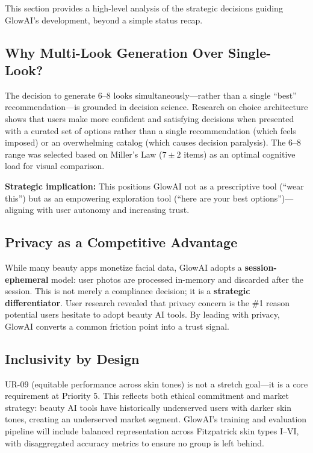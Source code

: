\documentclass[11pt, letterpaper]{article}
\begin{document}
This section provides a high-level analysis of the strategic decisions guiding GlowAI's development, beyond a simple status recap.

\subsection{Why Multi-Look Generation Over Single-Look?}

The decision to generate 6--8 looks simultaneously---rather than a single ``best'' recommendation---is grounded in decision science. Research on choice architecture shows that users make more confident and satisfying decisions when presented with a curated set of options rather than a single recommendation (which feels imposed) or an overwhelming catalog (which causes decision paralysis). The 6--8 range was selected based on Miller's Law ($7 \pm 2$ items) as an optimal cognitive load for visual comparison.

\textbf{Strategic implication:} This positions GlowAI not as a prescriptive tool (``wear this'') but as an empowering exploration tool (``here are your best options'')---aligning with user autonomy and increasing trust.

\subsection{Privacy as a Competitive Advantage}

While many beauty apps monetize facial data, GlowAI adopts a \textbf{session-ephemeral} model: user photos are processed in-memory and discarded after the session. This is not merely a compliance decision; it is a \textbf{strategic differentiator}. User research revealed that privacy concern is the \#1 reason potential users hesitate to adopt beauty AI tools. By leading with privacy, GlowAI converts a common friction point into a trust signal.

\subsection{Inclusivity by Design}

UR-09 (equitable performance across skin tones) is not a stretch goal---it is a core requirement at Priority 5. This reflects both ethical commitment and market strategy: beauty AI tools have historically underserved users with darker skin tones, creating an underserved market segment. GlowAI's training and evaluation pipeline will include balanced representation across Fitzpatrick skin types I--VI, with disaggregated accuracy metrics to ensure no group is left behind.
\end{document}
